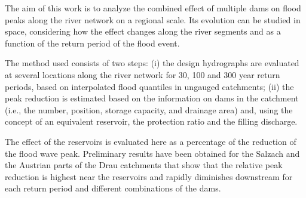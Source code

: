 The aim of this work is to analyze the combined effect of multiple dams on flood peaks along the river network on a regional scale. Its evolution can be studied in space, considering how the effect changes along the river segments and as a function of the return period of the flood event.

The method used consists of two steps: (i) the design hydrographs are evaluated at several locations along the river network for 30, 100 and 300 year return periods, based on interpolated flood quantiles in ungauged catchments; (ii) the peak reduction is estimated based on the information on dams in the catchment (i.e., the number, position, storage capacity, and drainage area) and, using the concept of an equivalent reservoir, the protection ratio and the filling discharge. 

The effect of the reservoirs is evaluated here as a percentage of the reduction of the flood wave peak. Preliminary results have been obtained for the Salzach and the Austrian parts of the Drau catchments that show that the relative peak reduction is highest near the reservoirs and rapidly diminishes downstream for each return period and different combinations of the dams. 
\newpage{}
{}
\begin{flushleft}





\end{flushleft}

\noindent

